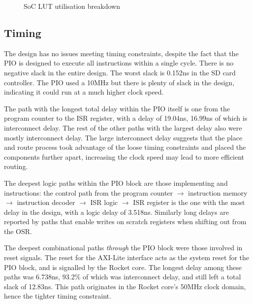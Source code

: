 \begin{figure}[H]
    \centering
    \caption{SoC LUT utilisation breakdown}
    \label{fig:pie}
\end{figure}

\subsection{Timing}

The design has no issues meeting timing constraints, despite the fact that the PIO is designed to execute all instructions within a single cycle. There is no negative slack in the entire design. The worst slack is 0.152ns in the SD card controller. The PIO used a 10MHz but there is plenty of slack in the design, indicating it could run at a much higher clock speed.

The path with the longest total delay within the PIO itself is one from the program counter to the ISR register, with a delay of 19.04ns, 16.99ns of which is interconnect delay. The rest of the other paths with the largest delay also were mostly interconnect delay. The large interconnect delay suggests that the place and route process took advantage of the loose timing constraints and placed the components further apart, increasing the clock speed may lead to more efficient routing.

The deepest logic paths within the PIO block are those implementing  and  instructions: the control path from the program counter $\rightarrow$ instruction memory $\rightarrow$ instruction decoder $\rightarrow$ ISR logic $\rightarrow$ ISR register is the one with the most delay in the design, with a logic delay of 3.518ns. Similarly long delays are reported by paths that enable writes on scratch registers when shifting out from the OSR.

The deepest combinational paths \textit{through} the PIO block were those involved in reset signals. The reset for the AXI-Lite interface acts as the system reset for the PIO block, and is signalled by the Rocket core. The longest delay among these paths was 6.738ns, 93.2\% of which was interconnect delay, and still left a total slack of 12.83ns. This path originates in the Rocket core's 50MHz clock domain, hence the tighter timing constraint.

